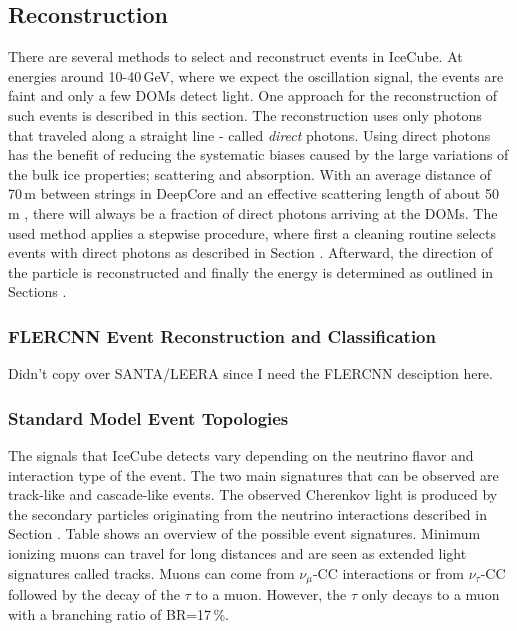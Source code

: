 \subsection{Reconstruction} 

There are several methods to select and reconstruct events in IceCube.
At energies around 10-40\,GeV, where we expect the oscillation signal, the events are faint and only a few DOMs detect light.
One approach for the reconstruction of such events is described in this section.
The reconstruction uses only photons that traveled along a straight line - called \textit{direct} photons.
Using direct photons has the benefit of reducing the systematic biases caused by the large variations of the bulk ice properties; scattering and absorption.
With an average distance of 70\,m between strings in DeepCore and an effective scattering length of about 50\,m , there will always be a fraction of direct photons arriving at the DOMs.
The used method applies a stepwise procedure, where first a cleaning routine selects events with direct photons as described in Section . 
Afterward, the direction of the particle is reconstructed and finally the energy is determined as outlined in Sections .


\subsubsection{FLERCNN Event Reconstruction and Classification} 

Didn't copy over SANTA/LEERA since I need the FLERCNN desciption here.


\subsubsection{Standard Model Event Topologies}

The signals that IceCube detects vary depending on the neutrino flavor and interaction type of the event.
The two main signatures that can be observed are track-like and cascade-like events.
The observed Cherenkov light is produced by the secondary particles originating from the neutrino interactions described in Section .
Table  shows an overview of the possible event signatures.
Minimum ionizing muons can travel for long distances and are seen as extended light signatures called tracks.
Muons can come from $\nu_\mu$-CC interactions or from $\nu_\tau$-CC followed by the decay of the $\tau$ to a muon.
However, the $\tau$ only decays to a muon with a branching ratio of BR=17\,\%.

